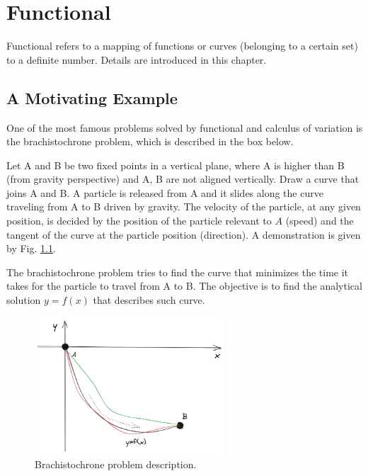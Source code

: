 \chapter{Functional}

Functional refers to a mapping of functions or curves (belonging to a certain set) to a definite number. Details are introduced in this chapter.

\section{A Motivating Example}

One of the most famous problems solved by functional and calculus of variation is the brachistochrone problem, which is described in the box below.

\begin{shortbox}

Let A and B be two fixed points in a vertical plane, where A is higher than B (from gravity perspective) and A, B are not aligned vertically. Draw a curve that joins A and B. A particle is released from A and it slides along the curve traveling from A to B driven by gravity. The velocity of the particle, at any given position, is decided by the position of the particle relevant to $A$ (speed) and the tangent of the curve at the particle position (direction). A demonstration is given by Fig. \ref{ch12fig:brachistochrone_description}.

The brachistochrone problem tries to find the curve that minimizes the time it takes for the particle to travel from A to B. The objective is to find the analytical solution $y=f(x)$ that describes such curve.

\end{shortbox}

\begin{figure}
	\centering
	\includegraphics[width=200pt]{chapters/part-4/figures/brachistochrone_description.png}
	\caption{Brachistochrone problem description.} \label{ch12fig:brachistochrone_description}
\end{figure}

